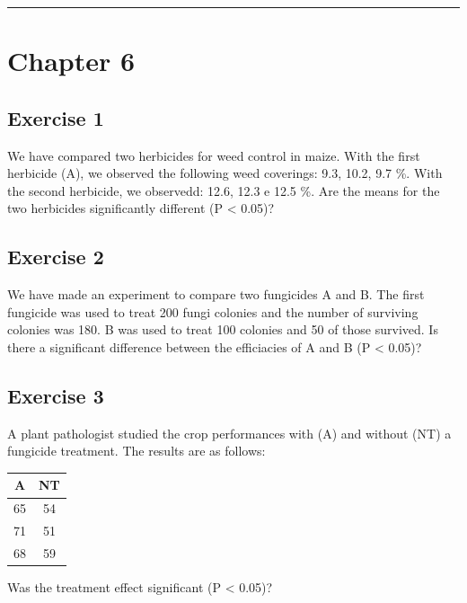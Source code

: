 \documentclass[a4paper,12pt,oneside]{book}
\begin{document}
\begin{center}\rule{0.5\linewidth}{0.5pt}\end{center}

\hypertarget{chapter-6}{%
\section{Chapter 6}\label{chapter-6}}

\hypertarget{exercise-1-3}{%
\subsection{Exercise 1}\label{exercise-1-3}}

We have compared two herbicides for weed control in maize. With the first herbicide (A), we observed the following weed coverings: 9.3, 10.2, 9.7 \%. With the second herbicide, we observedd: 12.6, 12.3 e 12.5 \%. Are the means for the two herbicides significantly different (P \textless{} 0.05)?

\hypertarget{exercise-2-3}{%
\subsection{Exercise 2}\label{exercise-2-3}}

We have made an experiment to compare two fungicides A and B. The first fungicide was used to treat 200 fungi colonies and the number of surviving colonies was 180. B was used to treat 100 colonies and 50 of those survived. Is there a significant difference between the efficiacies of A and B (P \textless{} 0.05)?

\hypertarget{exercise-3-3}{%
\subsection{Exercise 3}\label{exercise-3-3}}

A plant pathologist studied the crop performances with (A) and without (NT) a fungicide treatment. The results are as follows:

\begin{longtable}[]{@{}cc@{}}
\toprule
A & NT \\
\midrule
\endhead
65 & 54 \\
71 & 51 \\
68 & 59 \\
\bottomrule
\end{longtable}

Was the treatment effect significant (P \textless{} 0.05)?
\end{document}
